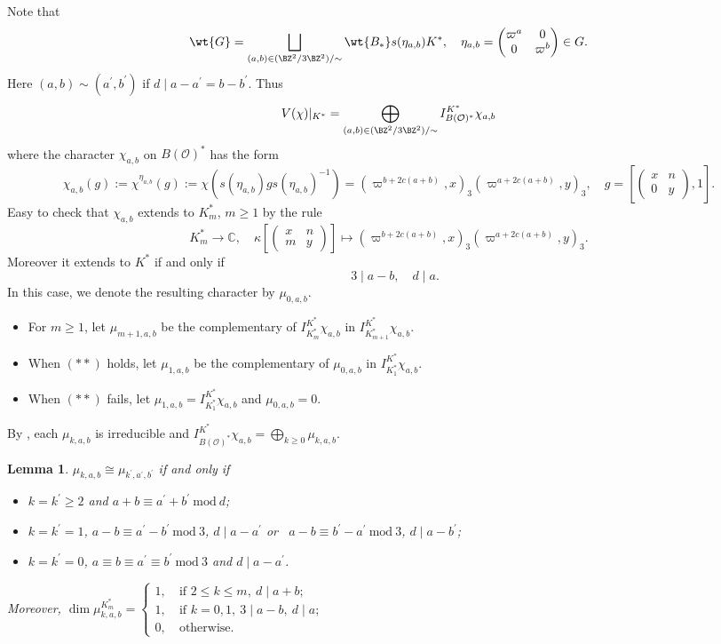 \documentclass[11pt,reqno]{amsart}
\newcommand{\BC}{{\mathbb {C}}} \newcommand{\BD}{{\mathbb {D}}}
\newcommand{\CO}{{\mathcal {O}}} \newcommand{\CP}{{\mathcal {P}}}
\renewcommand{\mod}{\ \mathrm{mod}\ }\renewcommand{\Re}{{\mathrm{Re}}}
\newcommand{\lra}{\longrightarrow}\newcommand{\lla}{\longleftarrow}
\theoremstyle{plain}
\newtheorem{lem}[thm]{Lemma}  \newtheorem{prop}[thm]{Proposition}
\theoremstyle{remark} \newtheorem{remark}[thm]{Remark}
\theoremstyle{definition} \newtheorem{exercise}[thm]{Exercise}
\theoremstyle{definition} \newtheorem{example}[thm]{Example} \newtheorem{condition}[thm]{Condition}
\numberwithin{equation}{section}
\renewcommand{\-}{\text{--}}
\begin{document}
 Note that $$\wt{G}=\bigsqcup_{(a,b)\in(\BZ^2/3\BZ^2)/\sim}\wt{B_*}s(\eta_{a,b})K^*,\quad \eta_{a,b}=\begin{pmatrix}\varpi^a & 0\\ 0 & \varpi^b\end{pmatrix}\in G.$$
Here $(a,b)\sim(a^\prime,b^\prime)$ if $d\mid a-a^\prime=b-b^\prime$. Thus \[V(\chi)|_{K^*}=\bigoplus_{(a,b)\in(\BZ^2/3\BZ^2)/\sim}I_{B(\CO)^*}^{K^*}\chi_{a,b}\]
where  the character $\chi_{a,b}$ on $B(\CO)^*$
has the form 
\[\chi_{a,b}(g):=\chi^{\eta_{a,b}}(g):=\chi(s(\eta_{a,b})gs(\eta_{a,b})^{-1})=(\varpi^{b+2c(a+b)}, x)_3(\varpi^{a+2c(a+b)},y)_3, \quad g=\left[\begin{pmatrix} x & n \\ 0 & y\end{pmatrix},1\right].\]
Easy to check that $\chi_{a,b}$ extends to $K_m^*$, $m\geq 1$ by the rule \[K_m^*\lra \BC,\quad \kappa\left[\begin{pmatrix} x & n \\ m & y\end{pmatrix}
\right]
\mapsto (\varpi^{b+2c(a+b)}, x)_3(\varpi^{a+2c(a+b)},y)_3.\]
Moreover it  extends to $K^*$ if and only if 
\[\tag{$**$} \quad 3\mid a-b,\quad d\mid a.\]
In this case, we denote the resulting character  by $\mu_{0,a,b}$. 
 \begin{itemize}
     \item For $m\geq 1$, let $\mu_{m+1,a,b}$ be the complementary of $I_{K_m^*}^{K^*} \chi_{a,b}$ in $I_{K_{m+1}^*}^{K^*}\chi_{a,b}$. 
     \item When   $(**)$ holds, let $\mu_{1,a,b}$ be the complementary of $\mu_{0,a,b}$ in $I_{K_1^*}^{K^*}\chi_{a,b}$.
     \item When $(**)$ fails, let $\mu_{1,a,b}=I_{K_1^*}^{K^*} \chi_{a,b}$ and $\mu_{0,a,b}=0$.
 \end{itemize}  
By \cite{Cas73}, each $\mu_{k,a,b}$ is irreducible  and 
$I_{B(\CO)^*}^{K^*}\chi_{a,b}=\bigoplus_{k\geq0}\mu_{k,a,b}$.
\begin{lem}\label{irreI}$\mu_{k,a,b}\cong \mu_{k^\prime,a^\prime,b^\prime}$ if and only if 
\begin{itemize}
    \item $k=k^\prime\geq2$ and $a+b\equiv a^\prime+b^\prime \mod d$; 
    \item $k=k^\prime=1$, $a-b\equiv a^\prime-b^\prime \mod 3$, $d\mid a-a^\prime$ or \ $a-b\equiv b^\prime-a^\prime \mod 3$, $d\mid a-b^\prime$;
    \item $k=k^\prime=0$, $a\equiv b\equiv a^\prime\equiv b^\prime \mod 3$ and $d\mid a-a^\prime$.
\end{itemize} 
 Moreover,  $\dim \mu_{k,a,b}^{K_m^*}=\begin{cases} 1, &\ \text{if }2\leq k\leq m,\ d\mid a+b;\\ 
 1, &\ \text{if } k=0,1,\ 3\mid a-b,\ d\mid a;\\
0, &\ \text{otherwise}.\end{cases}$
\end{lem}
\end{document}

